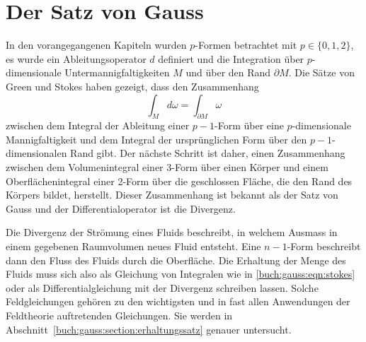 %
%
%
\chapter{Der Satz von Gauss
\label{chapter:gauss}}
In den vorangegangenen Kapiteln wurden $p$-Formen betrachtet mit
$p\in\{0,1,2\}$, es wurde ein Ableitungsoperator $d$ definiert
und die Integration über $p$-dimensionale Untermannigfaltigkeiten $M$
und über den Rand $\partial M$.
Die Sätze von Green und Stokes haben gezeigt, dass den Zusammenhang
\begin{equation}
\int_M d\omega = \int_{\partial M} \omega
\label{buch:gauss:eqn:stokes}
\end{equation}
zwischen dem Integral der Ableitung einer $p-1$-Form über eine
$p$-dimensionale Mannigfaltigkeit und dem Integral der ursprünglichen
Form über den $p-1$-dimensionalen Rand gibt.
Der nächste Schritt ist daher, einen Zusammenhang zwischen dem Volumenintegral
einer 3-Form über einen Körper und einem Oberflächenintegral
einer 2-Form über die geschlossen Fläche, die den Rand des Körpers bildet,
herstellt.
Dieser Zusammenhang ist bekannt als der Satz von Gauss und der
Differentialoperator ist die Divergenz.

Die Divergenz der Strömung eines Fluids beschreibt, in welchem Ausmass
in einem gegebenen Raumvolumen neues Fluid entsteht.
Eine $n-1$-Form beschreibt dann den Fluss des Fluids durch die Oberfläche.
Die Erhaltung der Menge des Fluids muss sich also als Gleichung
von Integralen wie in \eqref{buch:gauss:eqn:stokes} oder als
Differentialgleichung mit der Divergenz schreiben lassen.
Solche Feldgleichungen gehören zu den wichtigsten und in fast allen
Anwendungen der Feldtheorie auftretenden Gleichungen.
Sie werden in Abschnitt~\ref{buch:gauss:section:erhaltungssatz}
genauer untersucht.





